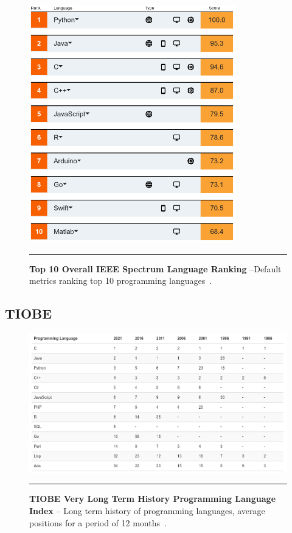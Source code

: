 \begin{figure}[H]
	\centering
        \includegraphics[width=0.8\textwidth]{media/literature/ieee-spectrum-all.png}
        \rule{35em}{0.5pt}
        \caption[Top 10 Overall IEEE Spectrum Language Ranking]{\textbf{Top 10 Overall IEEE Spectrum Language Ranking} --Default metrics ranking top 10 programming languages~\citep{ieee-spectrum}.}\label{fig:ieee-all}
\end{figure}


\subsection{TIOBE}

\begin{figure}[H]
	\centering
        \includegraphics[width=1.0\textwidth]{media/literature/tiobe-very-long-term-history.png}
        \rule{35em}{0.5pt}
        \caption[TIOBE Programming Language Index -- Long Term History]{\textbf{TIOBE Very Long Term History Programming Language Index} -- Long term history of programming languages, average positions for a period of 12 months~\citep{tiobe}.}\label{fig:tiobe-very-long-term}
\end{figure}

